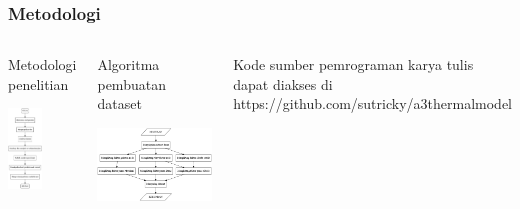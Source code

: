 \documentclass[8pt]{beamer}
\begin{document}
\begin{frame}
  \frametitle{Metodologi}
  \begin{columns}[T]
    \begin{block}{\center Metodologi penelitian}
      \begin{center}
    \includegraphics[width=0.5\textwidth]{figure/graph_metodologi.png}
      \end{center}
    \end{block}
    \begin{block}{\center Algoritma pembuatan dataset}
      \begin{center}
    \includegraphics[width=1.0\textwidth]{figure/graph_algoritma.png}
      \end{center}
    \end{block}
    Kode sumber pemrograman karya tulis dapat diakses di \color{blue}https://github.com/sutricky/a3thermalmodel
  \end{columns}
  

\end{frame}
\end{document}
